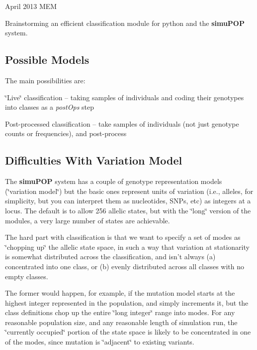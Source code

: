 April 2013 M\-E\-M

Brainstorming an efficient classification module for python and the {\bfseries simu\-P\-O\-P} system.

\subsection*{Possible Models}

The main possibilities are\-:


\begin{DoxyEnumerate}
\item \char`\"{}\-Live\char`\"{} classification -- taking samples of individuals and coding their genotypes into classes as a {\itshape post\-Ops} step
\end{DoxyEnumerate}
\begin{DoxyEnumerate}
\item Post-\/processed classification -- take samples of individuals (not just genotype counts or frequencies), and post-\/process
\end{DoxyEnumerate}

\subsection*{Difficulties With Variation Model}

The {\bfseries simu\-P\-O\-P} system has a couple of genotype representation models (\char`\"{}variation model\char`\"{}) but the basic ones represent units of variation (i.\-e., alleles, for simplicity, but you can interpret them as nucleotides, S\-N\-Ps, etc) as integers at a locus. The default is to allow 256 allelic states, but with the \char`\"{}long\char`\"{} version of the modules, a very large number of states are achievable.

The hard part with classification is that we want to specify a set of modes as \char`\"{}chopping up\char`\"{} the allelic state space, in such a way that variation at stationarity is somewhat distributed across the classification, and isn't always (a) concentrated into one class, or (b) evenly distributed across all classes with no empty classes.

The former would happen, for example, if the mutation model starts at the highest integer represented in the population, and simply increments it, but the class definitions chop up the entire \char`\"{}long integer\char`\"{} range into modes. For any reasonable population size, and any reasonable length of simulation run, the \char`\"{}currently occupied\char`\"{} portion of the state space is likely to be concentrated in one of the modes, since mutation is \char`\"{}adjacent\char`\"{} to existing variants.

